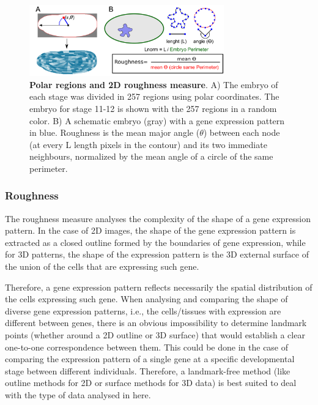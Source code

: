 
\begin{figure}[h]
  \includegraphics[width=0.75\textwidth]{./Images/roughness_regions.png}
  \centering
  \caption{\textbf{Polar regions and 2D roughness measure}. A) The embryo of each stage was divided in 257 regions using polar coordinates. The embryo for stage 11-12 is shown with the 257 regions in a random color. B) A schematic embryo (gray) with a gene expression pattern in blue. Roughness is the mean major angle ($\theta$) between each node (at every L length pixels in the contour) and its two immediate neighbours, normalized by the mean angle of a circle of the same perimeter.
   }
  \label{fig:roughness_regions}
\end{figure}

\subsubsection{Roughness}
\label{Methods_roughness}
The roughness measure analyses the complexity of the shape of a gene expression pattern. In the case of 2D images, the shape of the gene expression pattern is extracted as a closed outline formed by the boundaries of gene expression, while for 3D patterns, the shape of the expression pattern is the 3D external surface of the union of the cells that are expressing such gene.

Therefore, a gene expression pattern reflects necessarily the spatial distribution of the cells expressing such gene. When analysing and comparing the shape of diverse gene expression patterns, i.e., the cells/tissues with expression are different between genes, there is an obvious impossibility to determine landmark points (whether around a 2D outline or 3D surface) that would establish a clear one-to-one correspondence between them. This could be done in the case of comparing the expression pattern of a single gene at a specific developmental stage between different individuals.
Therefore, a landmark-free method (like outline methods for 2D or surface methods for 3D data) is best suited to deal with the type of data analysed in here.

